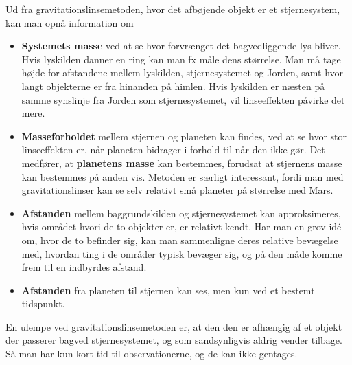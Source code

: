 Ud fra gravitationslinsemetoden, hvor det afbøjende objekt er et stjernesystem, kan man opnå information om
\begin{itemize}
    \item \textbf{Systemets masse} ved at se hvor forvrænget det bagvedliggende lys bliver. Hvis lyskilden danner en ring kan man fx måle dens størrelse. Man må tage højde for afstandene mellem lyskilden, stjernesystemet og Jorden, samt hvor langt objekterne er fra hinanden på himlen. Hvis lyskilden er næsten på samme synslinje fra Jorden som stjernesystemet, vil linseeffekten påvirke det mere.
    \item \textbf{Masseforholdet} mellem stjernen og planeten kan findes, ved at se hvor stor linseeffekten er, når planeten bidrager i forhold til når den ikke gør. Det medfører, at \textbf{planetens masse} kan bestemmes, forudsat at stjernens masse kan bestemmes på anden vis. Metoden er særligt interessant, fordi man med gravitationslinser kan se selv relativt små planeter på størrelse med Mars.
    \item \textbf{Afstanden} mellem baggrundskilden og stjernesystemet kan approksimeres, hvis området hvori de to objekter er, er relativt kendt. Har man en grov idé om, hvor de to befinder sig, kan man sammenligne deres relative bevægelse med, hvordan ting i de områder typisk bevæger sig, og på den måde komme frem til en indbyrdes afstand.
    \item \textbf{Afstanden} fra planeten til stjernen kan ses, men kun ved et bestemt tidspunkt. %
\end{itemize}

En ulempe ved gravitationslinsemetoden er, at den den er afhængig af et objekt der passerer bagved stjernesystemet, og som sandsynligvis aldrig vender tilbage. Så man har kun kort tid til observationerne, og de kan ikke gentages.

